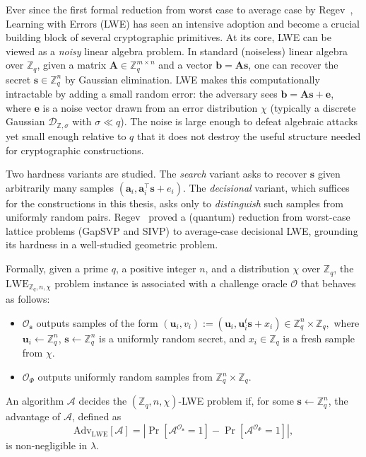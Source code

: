 \begin{definition}

Ever since the first formal reduction from worst case to average case by Regev~\cite{J:Regev09}, Learning with Errors (LWE) has seen an intensive adoption and become a crucial building block of several cryptographic primitives.
At its core, LWE can be viewed as a \emph{noisy} linear algebra problem. In standard (noiseless) linear algebra over $\mathbb{Z}_q$, given a matrix $\mathbf{A} \in \mathbb{Z}_q^{m \times n}$ and a vector $\mathbf{b} = \mathbf{A}\mathbf{s}$, one can recover the secret $\mathbf{s} \in \mathbb{Z}_q^n$ by Gaussian elimination. LWE makes this computationally intractable by adding a small random error: the adversary sees $\mathbf{b} = \mathbf{A}\mathbf{s} + \mathbf{e}$, where $\mathbf{e}$ is a noise vector drawn from an error distribution $\chi$ (typically a discrete Gaussian $\mathcal{D}_{\mathbb{Z},\sigma}$ with $\sigma \ll q$). The noise is large enough to defeat algebraic attacks yet small enough relative to $q$ that it does not destroy the useful structure needed for cryptographic constructions.

Two hardness variants are studied. The \emph{search} variant asks to recover $\mathbf{s}$ given arbitrarily many samples $(\mathbf{a}_i, \mathbf{a}_i^\top\mathbf{s} + e_i)$. The \emph{decisional} variant, which suffices for the constructions in this thesis, asks only to \emph{distinguish} such samples from uniformly random pairs. Regev~\cite{J:Regev09} proved a (quantum) reduction from worst-case lattice problems (GapSVP and SIVP) to average-case decisional LWE, grounding its hardness in a well-studied geometric problem.

Formally, given a prime $q$, a positive integer $n$, and a distribution $\chi$ over $\mathbb{Z}_q$, the
$\mathrm{LWE}_{\mathbb{Z}_q,n,\chi}$ problem instance is associated with a challenge oracle $\mathcal{O}$ that behaves as follows:
\begin{itemize}
    \item $\mathcal{O}_{\mathbf{s}}$ outputs samples of the form
    $(\mathbf{u}_i,v_i):=(\mathbf{u}_i,\mathbf{u}_i^t \mathbf{s}+x_i)\in \mathbb{Z}_q^n\times \mathbb{Z}_q,$
    where $\mathbf{u}_i\leftarrow \mathbb{Z}_q^n$, $\mathbf{s}\leftarrow \mathbb{Z}_q^n$ is a uniformly random secret, and
    $x_i\in \mathbb{Z}_q$ is a fresh sample from $\chi$.

    \item $\mathcal{O}_{\Phi}$ outputs uniformly random samples from $\mathbb{Z}_q^n\times \mathbb{Z}_q$.
\end{itemize}

An algorithm $\mathcal{A}$ decides the $(\mathbb{Z}_q,n,\chi)$-LWE problem if, for some
$\mathbf{s}\leftarrow \mathbb{Z}_q^n$, the advantage of $\mathcal{A}$, defined as
\[
\mathrm{Adv}_{\mathrm{LWE}}[\mathcal{A}]
=
\left|
\Pr[\mathcal{A}^{\mathcal{O}_{\mathbf{s}}}=1]
-
\Pr[\mathcal{A}^{\mathcal{O}_{\Phi}}=1]
\right|,
\]
is non-negligible in $\lambda$.
\end{definition}

